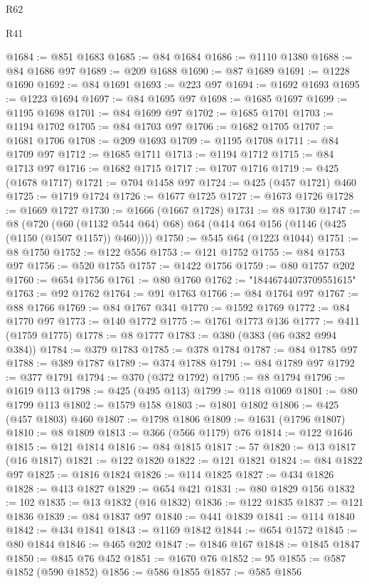 \begin{lexlean}{R62}
\begin{lexlean}{R41}
\begin{coremodule}
{{{{{{{{{{{{{{{{{{{{{{{{{{{{{{{{{{{{{{{{{{{{{{{{{{{{{{{{{{{{{{{{{{{{{{{{{{{{{{{{{{{{{{{@1684 := @851 @1683
@1685 := @84 @1684
@1686 := @1110 @1380
@1688 := @84 @1686 @97
@1689 := @209 @1688
@1690 := @87 @1689
@1691 := @1228 @1690
@1692 := @84 @1691
@1693 := @223 @97
@1694 := @1692 @1693
@1695 := @1223 @1694
@1697 := @84 @1695 @97
@1698 := @1685 @1697
@1699 := @1195 @1698
@1701 := @84 @1699 @97
@1702 := @1685 @1701
@1703 := @1194 @1702
@1705 := @84 @1703 @97
@1706 := @1682 @1705
@1707 := @1681 @1706
@1708 := @209 @1693
@1709 := @1195 @1708
@1711 := @84 @1709 @97
@1712 := @1685 @1711
@1713 := @1194 @1712
@1715 := @84 @1713 @97
@1716 := @1682 @1715
@1717 := @1707 @1716
@1719 := @425 (@1678 @1717)
@1721 := @704 @1458 @97
@1724 := @425 (@457 @1721) @460
@1725 := @1719 @1724
@1726 := @1677 @1725
@1727 := @1673 @1726
@1728 := @1669 @1727
@1730 := @1666 (@1667 @1728)
@1731 := @8 @1730
@1747 := @8
    (@720 (@60 (@1132 @544 @64) @68) @64 (@414 @64 @156 (@1146 (@425 (@1150 (@1507 @1157)) @460))))
@1750 := @545 @64 (@1223 @1044)
@1751 := @8 @1750
@1752 := @122 @556
@1753 := @121 @1752
@1755 := @84 @1753 @97
@1756 := @520 @1755
@1757 := @1422 @1756
@1759 := @80 @1757 @202
@1760 := @654 @1756
@1761 := @80 @1760
@1762 := "18446744073709551615"
@1763 := @92 @1762
@1764 := @91 @1763
@1766 := @84 @1764 @97
@1767 := @88 @1766
@1769 := @84 @1767 @341
@1770 := @1592 @1769
@1772 := @84 @1770 @97
@1773 := @140 @1772
@1775 := @1761 @1773 @136
@1777 := @411 (@1759 @1775)
@1778 := @8 @1777
@1783 := @380 (@383 (@6 @382 @994 @384))
@1784 := @379 @1783
@1785 := @378 @1784
@1787 := @84 @1785 @97
@1788 := @389 @1787
@1789 := @374 @1788
@1791 := @84 @1789 @97
@1792 := @377 @1791
@1794 := @370 (@372 @1792)
@1795 := @8 @1794
@1796 := @1619 @113
@1798 := @425 (@495 @113)
@1799 := @118 @1069
@1801 := @80 @1799 @113
@1802 := @1579 @158
@1803 := @1801 @1802
@1806 := @425 (@457 @1803) @460
@1807 := @1798 @1806
@1809 := @1631 (@1796 @1807)
@1810 := @8 @1809
@1813 := @366 (@566 @1179) @76
@1814 := @122 @1646
@1815 := @121 @1814
@1816 := @84 @1815
@1817 := 57
@1820 := @13 @1817 (@16 @1817)
@1821 := @122 @1820
@1822 := @121 @1821
@1824 := @84 @1822 @97
@1825 := @1816 @1824
@1826 := @114 @1825
@1827 := @434 @1826
@1828 := @413 @1827
@1829 := @654 @421
@1831 := @80 @1829 @156
@1832 := 102
@1835 := @13 @1832 (@16 @1832)
@1836 := @122 @1835
@1837 := @121 @1836
@1839 := @84 @1837 @97
@1840 := @441 @1839
@1841 := @114 @1840
@1842 := @434 @1841
@1843 := @1169 @1842
@1844 := @654 @1572
@1845 := @80 @1844
@1846 := @465 @202
@1847 := @1846 @167
@1848 := @1845 @1847
@1850 := @845 @76 @452
@1851 := @1670 @76
@1852 := 95
@1855 := @587 @1852 (@590 @1852)
@1856 := @586 @1855
@1857 := @585 @1856
}}}}}}}}}}}}}}}}}}}}}}}}}}}}}}}}}}}}}}}}}}}}}}}}}}}}}}}}}}}}}}}}}}}}}}}}}}}}}}}}}}}}}}}
\end{coremodule}
\end{lexlean}
\end{lexlean}
